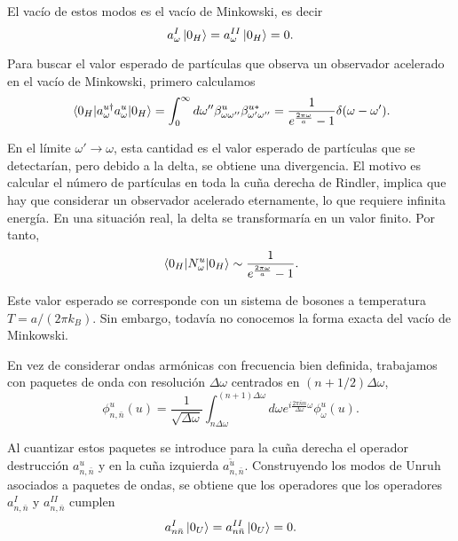 El vacío de estos modos es el vacío de Minkowski, es decir
\begin{equation}
  a_\omega^I \ket{0_H} = a_\omega^{II}\ket{0_H} = 0.
\end{equation}
 
Para buscar el valor esperado de partículas que observa un observador acelerado
en el vacío de Minkowski, primero calculamos
\begin{equation}
  \ev{a_\omega^{u\dagger}a_\omega^u}{0_H} = \int_0^\infty d\omega'' \beta_{\omega\omega''}^u
  \beta_{\omega'\omega''}^{u*} = \frac{1}{e^{\frac{2\pi\omega}{a}}-1}\delta(\omega-\omega').
\end{equation}

En el límite $\omega'\to\omega$, esta cantidad es el valor esperado de partículas que se
detectarían, pero debido a la delta, se obtiene una divergencia.
El motivo es calcular el número de partículas en toda la cuña derecha de Rindler, 
implica que hay que considerar un observador acelerado eternamente, lo que requiere infinita
energía.
En una situación real, la delta se transformaría en un valor finito.
Por tanto,
\begin{equation}
  \ev{N_\omega^u}{0_H} \sim \frac{1}{e^{\frac{2\pi\omega}{a}}-1}.
\end{equation}

Este valor esperado se corresponde con un sistema de bosones a temperatura $T=a/(2\pi k_B)$.
Sin embargo, todavía no conocemos la forma exacta del vacío de Minkowski.

En vez de considerar ondas armónicas con frecuencia bien definida, trabajamos con paquetes
de onda con resolución $\Delta \omega$ centrados en $(n+1/2)\Delta \omega$,
\begin{equation}
  \phi_{n,\bar n}^u(u)=\frac{1}{\sqrt{\Delta \omega}}\int_{n\Delta\omega}^{(n+1)\Delta \omega}d\omega e^{i\frac{2\pi \bar n n}{\Delta \omega}\omega}
  \phi^u_\omega(u).
\end{equation}

Al cuantizar estos paquetes se introduce para la cuña derecha el operador destrucción $a_{n,\bar n}^u$
y en la cuña izquierda $a_{n,\bar n}^{\tilde u}$. 
Construyendo los modos de Unruh asociados a paquetes de ondas, se obtiene que
los operadores que los operadores $a_{n,\bar n}^I$ y $a_{n,\bar n}^{II}$ cumplen
\begin{equation}
  a_{n\bar n}^I\ket{0_U} = a_{n\bar n}^{II} \ket{0_U} = 0.
\end{equation}

